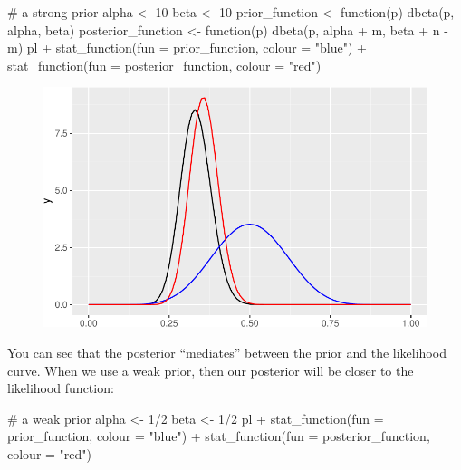 \documentclass[
  letterpaper,
  DIV=11,
  numbers=noendperiod]{scrreprt}
\newenvironment{Shaded}{\begin{snugshade}}{\end{snugshade}}
\newcommand{\AttributeTok}[1]{\textcolor[rgb]{0.40,0.45,0.13}{#1}}
\newcommand{\CommentTok}[1]{\textcolor[rgb]{0.37,0.37,0.37}{#1}}
\newcommand{\ControlFlowTok}[1]{\textcolor[rgb]{0.00,0.23,0.31}{#1}}
\newcommand{\DecValTok}[1]{\textcolor[rgb]{0.68,0.00,0.00}{#1}}
\newcommand{\FunctionTok}[1]{\textcolor[rgb]{0.28,0.35,0.67}{#1}}
\newcommand{\NormalTok}[1]{\textcolor[rgb]{0.00,0.23,0.31}{#1}}
\newcommand{\OtherTok}[1]{\textcolor[rgb]{0.00,0.23,0.31}{#1}}
\newcommand{\SpecialCharTok}[1]{\textcolor[rgb]{0.37,0.37,0.37}{#1}}
\newcommand{\StringTok}[1]{\textcolor[rgb]{0.13,0.47,0.30}{#1}}
\begin{document}
\begin{Shaded}
\begin{Highlighting}[]
\CommentTok{\# a strong prior}
\NormalTok{alpha }\OtherTok{\textless{}{-}} \DecValTok{10}
\NormalTok{beta }\OtherTok{\textless{}{-}} \DecValTok{10}
\NormalTok{prior\_function }\OtherTok{\textless{}{-}} \ControlFlowTok{function}\NormalTok{(p) }\FunctionTok{dbeta}\NormalTok{(p, alpha, beta)}
\NormalTok{posterior\_function }\OtherTok{\textless{}{-}} \ControlFlowTok{function}\NormalTok{(p) }\FunctionTok{dbeta}\NormalTok{(p, alpha }\SpecialCharTok{+}\NormalTok{ m, beta }\SpecialCharTok{+}\NormalTok{ n }\SpecialCharTok{{-}}\NormalTok{ m)}
\NormalTok{pl }\SpecialCharTok{+} \FunctionTok{stat\_function}\NormalTok{(}\AttributeTok{fun =}\NormalTok{ prior\_function, }\AttributeTok{colour =} \StringTok{"blue"}\NormalTok{) }\SpecialCharTok{+} 
  \FunctionTok{stat\_function}\NormalTok{(}\AttributeTok{fun =}\NormalTok{ posterior\_function, }\AttributeTok{colour =} \StringTok{"red"}\NormalTok{)}
\end{Highlighting}
\end{Shaded}

\begin{figure}[H]

{\centering \includegraphics{./06-likelihood_files/figure-pdf/unnamed-chunk-6-1.pdf}

}

\end{figure}

You can see that the posterior ``mediates'' between the prior and the
likelihood curve. When we use a weak prior, then our posterior will be
closer to the likelihood function:

\begin{Shaded}
\begin{Highlighting}[]
\CommentTok{\# a weak prior}
\NormalTok{alpha }\OtherTok{\textless{}{-}} \DecValTok{1}\SpecialCharTok{/}\DecValTok{2}
\NormalTok{beta }\OtherTok{\textless{}{-}} \DecValTok{1}\SpecialCharTok{/}\DecValTok{2}
\NormalTok{pl }\SpecialCharTok{+} \FunctionTok{stat\_function}\NormalTok{(}\AttributeTok{fun =}\NormalTok{ prior\_function, }\AttributeTok{colour =} \StringTok{"blue"}\NormalTok{) }\SpecialCharTok{+} 
  \FunctionTok{stat\_function}\NormalTok{(}\AttributeTok{fun =}\NormalTok{ posterior\_function, }\AttributeTok{colour =} \StringTok{"red"}\NormalTok{)}
\end{Highlighting}
\end{Shaded}
\end{document}
